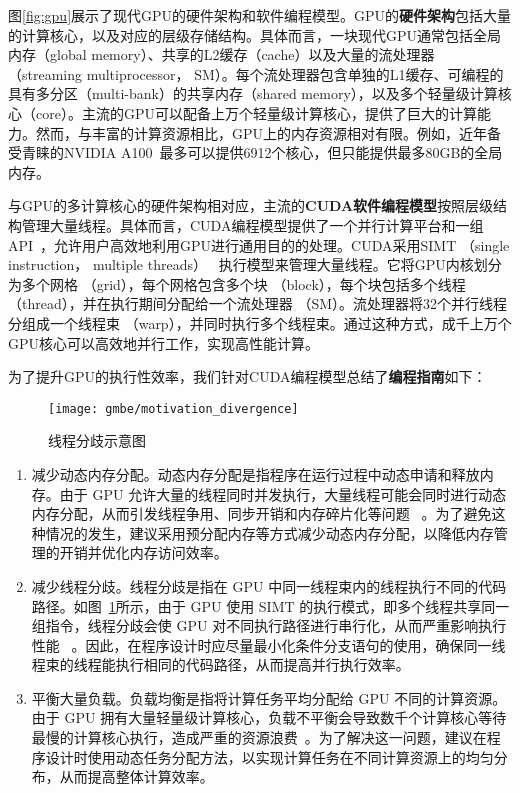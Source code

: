 图\ref{fig:gpu}展示了现代GPU的硬件架构和软件编程模型。GPU的\textbf{硬件架构}包括大量的计算核心，以及对应的层级存储结构。具体而言，一块现代GPU通常包括全局内存（global memory）、共享的L2缓存（cache）以及大量的流处理器 （streaming multiprocessor， SM）。每个流处理器包含单独的L1缓存、可编程的具有多分区（multi-bank）的共享内存（shared memory），以及多个轻量级计算核心（core）。主流的GPU可以配备上万个轻量级计算核心，提供了巨大的计算能力。然而，与丰富的计算资源相比，GPU上的内存资源相对有限。例如，近年备受青睐的NVIDIA A100~\cite{NVIDIA-A100}最多可以提供6912个核心，但只能提供最多80GB的全局内存。

与GPU的多计算核心的硬件架构相对应，主流的\textbf{CUDA软件编程模型}按照层级结构管理大量线程。具体而言，CUDA编程模型提供了一个并行计算平台和一组API~\cite{CUDA-wiki,CUDAProgrammingGuide}，允许用户高效地利用GPU进行通用目的的处理。CUDA采用SIMT （single instruction， multiple threads）~\cite{SIMT-wiki} 执行模型来管理大量线程。它将GPU内核划分为多个网格 （grid），每个网格包含多个块 （block），每个块包括多个线程 （thread），并在执行期间分配给一个流处理器 （SM）。流处理器将32个并行线程分组成一个线程束 （warp），并同时执行多个线程束。通过这种方式，成千上万个GPU核心可以高效地并行工作，实现高性能计算。

为了提升GPU的执行性效率，我们针对CUDA编程模型总结了\textbf{编程指南}如下：

\begin{figure} [t]
  \center
		\texttt{[image: gmbe/motivation\_divergence]}
	\caption{线程分歧示意图}
	\label{fig:gmbe_motivation_divergence}
\end{figure}



\begin{enumerate}
  \item 减少动态内存分配。动态内存分配是指程序在运行过程中动态申请和释放内存。由于 GPU 允许大量的线程同时并发执行，大量线程可能会同时进行动态内存分配，从而引发线程争用、同步开销和内存碎片化等问题 ~\cite{DynamicMallocGpu21}。为了避免这种情况的发生，建议采用预分配内存等方式减少动态内存分配，以降低内存管理的开销并优化内存访问效率。
  
  \item 减少线程分歧。线程分歧是指在 GPU 中同一线程束内的线程执行不同的代码路径。如图~\ref{fig:gmbe_motivation_divergence}所示，由于 GPU 使用 SIMT 的执行模式，即多个线程共享同一组指令，线程分歧会使 GPU 对不同执行路径进行串行化，从而严重影响执行性能 ~\cite{CUDAProgrammingGuide}。因此，在程序设计时应尽量最小化条件分支语句的使用，确保同一线程束的线程能执行相同的代码路径，从而提高并行执行效率。

  \item 平衡大量负载。负载均衡是指将计算任务平均分配给 GPU 不同的计算资源。由于 GPU 拥有大量轻量级计算核心，负载不平衡会导致数千个计算核心等待最慢的计算核心执行，造成严重的资源浪费~\cite{CUDAProgrammingGuide}。为了解决这一问题，建议在程序设计时使用动态任务分配方法，以实现计算任务在不同计算资源上的均匀分布，从而提高整体计算效率。
\end{enumerate}


